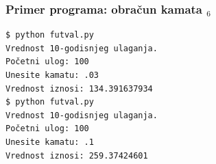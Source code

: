 \documentclass[utf8,compress]{beamer}
\begin{document}
\begin{frame}[fragile]
  \frametitle{Primer programa: obračun kamata $_6$}
\begin{verbatim}
$ python futval.py
Vrednost 10-godisnjeg ulaganja.
Početni ulog: 100
Unesite kamatu: .03
Vrednost iznosi: 134.391637934
$ python futval.py
Vrednost 10-godisnjeg ulaganja.
Početni ulog: 100
Unesite kamatu: .1
Vrednost iznosi: 259.37424601
\end{verbatim}
\end{frame}
\end{document}
